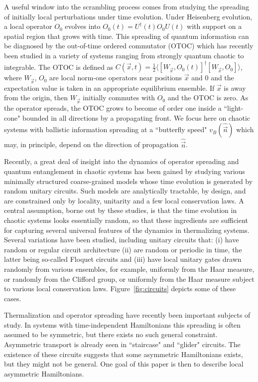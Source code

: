 \documentclass[aps,prx,reprint,superscriptaddress, longbibliography]{revtex4-1}
\newcommand{\charlie}[1]{{\color{Magenta}{{#1}}}}
\begin{document}
A useful window into the scrambling process comes from studying the spreading of initially local perturbations under time evolution. Under Heisenberg evolution, a local operator $O_0$ evolves into $O_0(t) = U^\dagger(t) O_0 U(t)$ with support on a spatial region that grows with time. This spreading of quantum information can be diagnosed by the out-of-time ordered commutator (OTOC) which has recently been studied in a variety of systems ranging from strongly quantum chaotic to integrable. The OTOC is defined as $C(\vec{x},t) = \frac{1}{2} \langle [W_\vec{x}, O_0(t)]^\dagger [W_\vec{x}, O_0]\rangle$, where $W_\vec{x}$, $O_0$ are local norm-one operators near positions $\vec{x}$ and $0$ and the expectation value is taken in an appropriate equilibrium ensemble. If $\vec{x}$ is away from the origin, then $W_\vec{x}$ initially commutes with $O_0$ and the OTOC is zero. As the operator spreads, the OTOC grows to become of order one inside a ``light-cone" bounded in all directions by a propagating front. We focus here on chaotic systems with ballistic information spreading at a ``butterfly speed" $v_B(\hat{\vec{n}})$ which may, in principle, depend on the direction of propagation $\hat{\vec{n}}$. 

Recently, a great deal of insight into the dynamics of operator spreading and quantum entanglement in chaotic systems has been gained by studying various minimally structured coarse-grained models whose time evolution is generated by random unitary circuits. 
Such models are analytically tractable, by design, and are constrained only by locality, unitarity and a few local conservation laws. 
A central assumption, borne out by these studies, is that the time evolution in chaotic systems looks essentially random, so that these ingredients are sufficient for capturing several universal features of the dynamics in thermalizing systems. Several variations have been studied, including unitary circuits that: (i) have random or regular circuit architecture (ii) are random or periodic in time, the latter being so-called Floquet circuits and (iii) have local unitary gates drawn randomly from various ensembles, for example, uniformly from the Haar measure, or randomly from the Clifford group, or uniformly from the Haar measure subject to various local conservation laws. Figure~\ref{fig:circuits} depicts some of these cases. 




Thermalization and operator spreading have recently been important subjects of study. In systems with time-independent Hamiltonians this spreading is often assumed to be symmetric, but there exists no such general constraint. Asymmetric transport is already seen in ``staircase" and ``glider" circuits. The existence of these circuits suggests that some asymmetric Hamiltonians exists, but they might not be general. One goal of this paper is then to describe \charlie{tunable} local asymmetric Hamiltonians.
\end{document}

